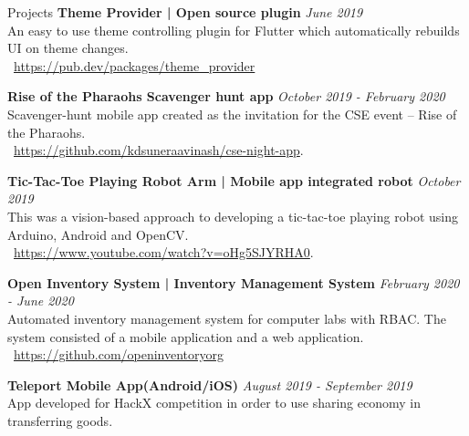 \documentclass{cv}
\begin{document}
\begin{adjustwidth}{55pt}{0pt}
    \begin{rSection}{Projects}
        {\bf Theme Provider | Open source plugin}                        \hfill {\em June 2019}
        \\An easy to use theme controlling plugin for Flutter which automatically rebuilds UI on theme changes. \\
        \faPlug\ \url{https://pub.dev/packages/theme\_provider} \par
        {\bf Rise of the Pharaohs Scavenger hunt app}                 \hfill {\em October 2019 - February 2020}
        \\Scavenger-hunt mobile app created as the invitation for the CSE event – Rise of the Pharaohs.\\
        \faGithub*\ \url{https://github.com/kdsuneraavinash/cse-night-app}. \par
        {\bf Tic-Tac-Toe Playing Robot Arm | Mobile app integrated robot}     \hfill {\em October 2019}
        \\This was a vision-based approach to developing a tic-tac-toe playing robot using Arduino, Android and OpenCV.\\
        \faYoutube\ \url{https://www.youtube.com/watch?v=oHg5SJYRHA0}. \par
        {\bf Open Inventory System | Inventory Management System}     \hfill {\em February 2020 - June 2020}
        \\Automated inventory management system for computer labs with RBAC. The system consisted of a mobile application and a web application.\\
        \faGithub\ \url{https://github.com/openinventoryorg} \par
        {\bf Teleport Mobile App(Android/iOS)}                        \hfill {\em August 2019 - September 2019}
        \\App developed for HackX competition in order to use sharing economy in transferring goods.
    \end{rSection}

\end{adjustwidth}
\end{document}
